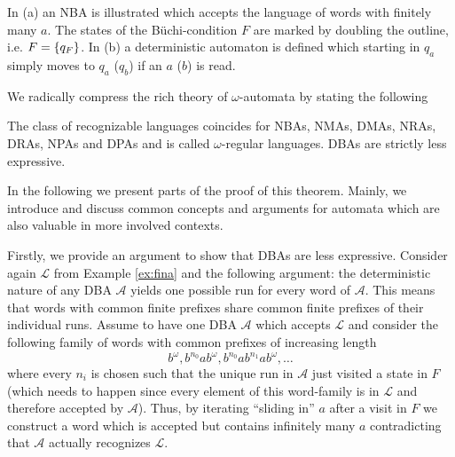 \begin{drawing}
  \caption{In (a) an \ac{NBA} is illustrated which accepts the language of
  words with finitely many $a$. The states of the Büchi-condition $F$ are
  marked by doubling the outline, i.e. $F = \left\{q_{F}\right\}$.
  In (b) a deterministic automaton is defined which starting in $q_{a}$ simply
  moves to $q_{a}$ ($q_{b}$) if an $a$ ($b$) is read.}
  \label{fig:finaautomata}
\end{drawing}
We radically compress the rich theory of $\omega$-automata by stating the
following
\begin{theorem}
  \cite[Theorem 1.19, Theorem 1.24, Section 1.3.2,Theorem 3.2]{AutoLogInfGames}
  The class of recognizable languages coincides for \acp{NBA}, \acp{NMA},
  \acp{DMA}, \acp{NRA}, \acp{DRA}, \acp{NPA} and \acp{DPA} and is called
  $\omega$-regular languages. \acp{DBA} are strictly less expressive.
  \label{thm:omegaregularexp}
\end{theorem}
In the following we present parts of the proof of this theorem. Mainly, we
introduce and discuss common concepts and arguments for automata which are also 
valuable in more involved contexts.

Firstly, we provide an argument to show that \acp{DBA} are less expressive.
Consider again $\mathcal{L}$ from Example \ref{ex:fina} and the following
argument: the deterministic nature of any \ac{DBA} $\mathcal{A}$ yields one
possible run for every word of $\mathcal{A}$. This means that words with
common finite prefixes share common finite prefixes of their individual runs.
Assume to have one \ac{DBA} $\mathcal{A}$ which accepts $\mathcal{L}$ and
consider the following family of words with common prefixes of increasing 
length
\begin{equation*}
  b^{\omega}, b^{n_{0}}ab^{\omega}, b^{n_{0}}ab^{n_{1}}ab^{\omega}, \dots
\end{equation*}
where every $n_{i}$ is chosen such that the unique run in $\mathcal{A}$
just visited a state in $F$ (which needs to happen since every element of
this word-family is in $\mathcal{L}$ and therefore accepted by
$\mathcal{A}$). Thus, by iterating \enquote{sliding in} $a$ after a visit in
$F$ we construct a word which is accepted but contains infinitely many $a$
contradicting that $\mathcal{A}$ actually recognizes $\mathcal{L}$.


